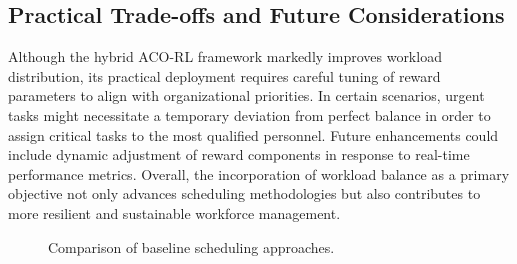 \documentclass[conference]{IEEEtran}
\begin{document}
\subsection{Practical Trade-offs and Future Considerations}
Although the hybrid ACO-RL framework markedly improves workload distribution,
its practical deployment requires careful tuning of reward parameters to align
with organizational priorities. In certain scenarios, urgent tasks might
necessitate a temporary deviation from perfect balance in order to assign
critical tasks to the most qualified personnel. Future enhancements could include
dynamic adjustment of reward components in response to real-time performance metrics.
Overall, the incorporation of workload balance as a primary objective not only
advances scheduling methodologies but also contributes to more resilient and sustainable
workforce management.


\begin{figure}[htbp]
	\centering
	\hfill
	\hfill
	\caption{Comparison of baseline scheduling approaches.}
	\label{fig:baseline}
\end{figure}
\end{document}
